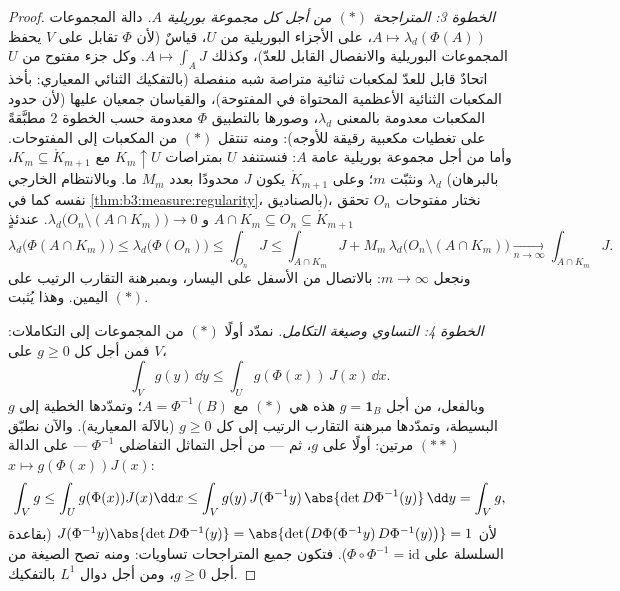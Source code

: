 \begin{proof}
\emph{الخطوة 3: المتراجحة $(*)$ من أجل كل مجموعة بوريلية $A$.}
دالة المجموعات $A
\mapsto \lambda_d(\Phi(A))$، على الأجزاء البوريلية من $U$، قياسٌ
(لأن $\Phi$ تقابل على $V$ يحفظ المجموعات البوريلية والانفصال
القابل للعدّ)، وكذلك $A \mapsto \int_AJ$. وكل جزء مفتوح من $U$ اتحادٌ قابل للعدّ
لمكعبات ثنائية متراصة شبه منفصلة (بالتفكيك الثنائي المعياري:
بأخذ المكعبات الثنائية الأعظمية المحتواة في المفتوحة)، والقياسان
جمعيان عليها (لأن حدود المكعبات معدومة  بالمعنى
$\lambda_d$، وصورها بالتطبيق $\Phi$ معدومة  حسب الخطوة 2
مطبَّقةً على تغطيات مكعبية رقيقة للأوجه): ومنه تنتقل $(*)$ من
المكعبات إلى المفتوحات. وأما من أجل مجموعة بوريلية عامة $A$:
فنستنفد $U$ بمتراصات $K_m \uparrow U$ مع $K_m \subseteq
\mathring K_{m+1}$، ونثبّت $m$؛
وعلى $\mathring K_{m+1}$ يكون $J$ محدودًا بعدد $M_m$ ما. وبالانتظام الخارجي
 $\lambda_d$ (بالبرهان نفسه كما في \cref{thm:b3:measure:regularity}،
بالصناديق)، نختار مفتوحات $O_n$ تحقق $A \cap K_m \subseteq O_n
\subseteq \mathring K_{m+1}$ و $\lambda_d\bigl(O_n \setminus
(A\cap K_m)\bigr) \to 0$. عندئذٍ
\[
\lambda_d\bigl(\Phi(A\cap K_m)\bigr) \leq
\lambda_d\bigl(\Phi(O_n)\bigr) \leq \int_{O_n}J
\leq \int_{A\cap K_m}J + M_m\,\lambda_d\bigl(O_n\setminus(A\cap
K_m)\bigr) \xrightarrow[n\to\infty]{} \int_{A\cap K_m}J .
\]
ونجعل $m \to \infty$: بالاتصال من الأسفل على اليسار، وبمبرهنة
التقارب الرتيب على اليمين. وهذا يُثبت $(*)$.

\emph{الخطوة 4: التساوي وصيغة التكامل.} نمدّد أولًا $(*)$ من
المجموعات إلى التكاملات: فمن أجل كل  $g
\geq 0$
على $V$،
\[
\int_V g(y)\,\dd y \leq \int_U g(\Phi(x))\,J(x)\,\dd x .
\tag{$**$}
\]
وبالفعل، من أجل $g = \mathbf 1_B$ هذه هي $(*)$ مع $A =
\Phi^{-1}(B)$؛ وتمدّدها
الخطية إلى $g$ البسيطة، وتمدّدها مبرهنة التقارب الرتيب إلى كل
$g \geq 0$ (بالآلة المعيارية). والآن نطبّق $(**)$ مرتين: أولًا
على $g$، ثم --- من أجل التماثل التفاضلي $\Phi^{-1}$ --- على
الدالة $x \mapsto g(\Phi(x))J(x)$:
\[
\int_Vg \leq \int_U g(\Phi(x))J(x)\dd x
\leq \int_V g(y)\,J(\Phi^{-1}y)\,\abs{\det
D\Phi^{-1}(y)}\,\dd y = \int_V g ,
\]
لأن $J(\Phi^{-1}y)\abs{\det D\Phi^{-1}(y)} = \abs{\det\bigl(
D\Phi(\Phi^{-1}y)\,D\Phi^{-1}(y)\bigr)} = 1$ (بقاعدة السلسلة على $\Phi\circ\Phi^{-1} = \mathrm{id}$). فتكون جميع المتراجحات
تساويات: ومنه تصح الصيغة من أجل $g \geq 0$، ومن أجل دوال $L^1$
بالتفكيك.
\end{proof}

